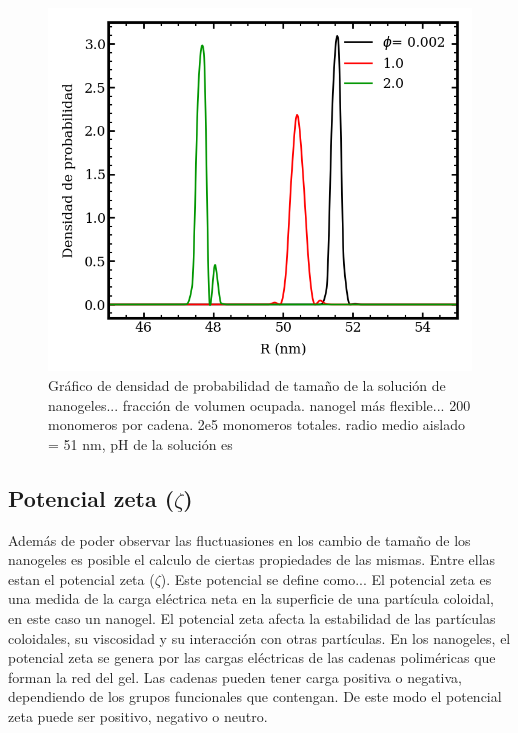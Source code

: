 \begin{figure}[!tb]
	\centering
	\includegraphics[width=1\linewidth]{Figures/graph-mc/sizes.png}
	\caption{Gr\'afico de densidad de probabilidad de tama\~no de la soluci\'on de  nanogeles... fracci\'on de volumen ocupada. nanogel m\'as flexible... 200 monomeros por cadena. 2e5 monomeros totales. radio medio aislado = 51 nm, pH de la soluci\'on es  }
	\label{fig:mc:dentos-sizes}
\end{figure}

\subsection{Potencial zeta ($\zeta$)}


Adem\'as de poder observar las fluctuasiones en los cambio de tamaño de los nanogeles es posible el calculo de ciertas propiedades de las mismas. Entre ellas estan el potencial zeta ($\zeta$).
Este potencial se define como...
El potencial zeta es una medida de la carga el\'ectrica neta en la superficie de una part\'icula coloidal, en este caso un nanogel. El potencial zeta afecta la estabilidad de las part\'iculas coloidales, su viscosidad y su interacci\'on con otras part\'iculas.
En los nanogeles, el potencial zeta se genera por las cargas el\'ectricas de las cadenas polim\'ericas que forman la red del gel. Las cadenas  pueden tener carga positiva o negativa, dependiendo de los grupos funcionales que contengan. De este modo el potencial zeta puede ser positivo, negativo o neutro.


